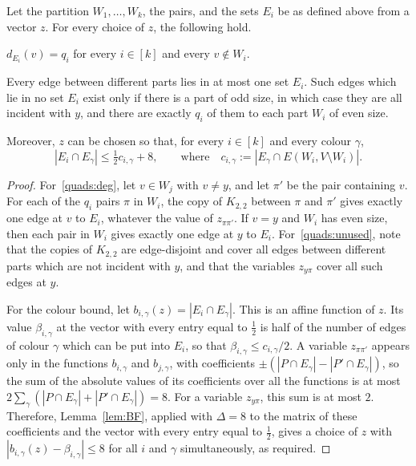 \begin{lemma}\label{lem:quads}
Let the partition $W_1,\dots,W_k$, the pairs, and the sets $E_i$ be as defined above from a vector $z$. For every choice of $z$, the following hold.
\begin{props}
\item $d_{E_i}(v)=q_i$ for every $i\in [k]$ and every $v\notin W_i$.\label{quads:deg}
\item Every edge between different parts lies in at most one set $E_i$. Such edges which lie in no set $E_i$ exist only if there is a part of odd size, in which case they are all incident with $y$, and there are exactly $q_i$ of them to each part $W_i$ of even size.\label{quads:unused}
\end{props}
Moreover, $z$ can be chosen so that, for every $i\in [k]$ and every colour $\gamma$,
\begin{equation}\label{eq:disc}
|E_i\cap E_\gamma|\le\tfrac12 c_{i,\gamma}+8,\qquad\text{where}\quad c_{i,\gamma}:=|E_\gamma\cap E(W_i,V\setminus W_i)|.
\end{equation}
\end{lemma}
\begin{proof}
For~\ref{quads:deg}, let $v\in W_j$ with $v\neq y$, and let $\pi'$ be the pair containing $v$. For each of the $q_i$ pairs $\pi$ in $W_i$, the copy of $K_{2,2}$ between $\pi$ and $\pi'$ gives exactly one edge at $v$ to $E_i$, whatever the value of $z_{\pi\pi'}$. If $v=y$ and $W_i$ has even size, then each pair in $W_i$ gives exactly one edge at $y$ to $E_i$.
For~\ref{quads:unused}, note that the copies of $K_{2,2}$ are edge-disjoint and cover all edges between different parts which are not incident with $y$, and that the variables $z_{y\pi}$ cover all such edges at $y$.

For the colour bound, let $b_{i,\gamma}(z)=|E_i\cap E_\gamma|$. This is an affine function of $z$. Its value $\beta_{i,\gamma}$ at the vector with every entry equal to $\frac12$ is half of the number of edges of colour $\gamma$ which can be put into $E_i$, so that $\beta_{i,\gamma}\le c_{i,\gamma}/2$.
A variable $z_{\pi\pi'}$ appears only in the functions $b_{i,\gamma}$ and $b_{j,\gamma}$, with coefficients $\pm(|P\cap E_\gamma|-|P'\cap E_\gamma|)$, so the sum of the absolute values of its coefficients over all the functions is at most $2\sum_\gamma(|P\cap E_\gamma|+|P'\cap E_\gamma|)=8$. For a variable $z_{y\pi}$, this sum is at most $2$.
Therefore, Lemma~\ref{lem:BF}, applied with $\Delta=8$ to the matrix of these coefficients and the vector with every entry equal to $\frac12$, gives a choice of $z$ with $|b_{i,\gamma}(z)-\beta_{i,\gamma}|\le8$ for all $i$ and $\gamma$ simultaneously, as required.
\end{proof}

